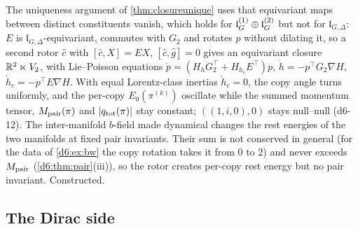 \begin{remark}
\label{d6:rem:copyrotor}
The uniqueness argument of \cref{thm:closureunique} uses that equivariant maps between distinct constituents vanish, which holds for
$\mathfrak l_G^{(1)}\oplus\mathfrak l_G^{(2)}$ but not for $\mathfrak l_{G,\Delta}$: $E$ is $\mathfrak l_{G,\Delta}$-equivariant, commutes with $G_2$ and rotates $p$ without dilating it, so a
second rotor $\hat c$ with $[\hat c,X]=EX$, $[\hat c,\hat g]=0$ gives an equivariant closure $\mathbb{R}^2\ltimes V_2$, with Lie--Poisson equations
$\dot p=(H_hG_2^{\!\top}+H_{h_c}E^{\!\top})p$, $\dot h=-p^{\!\top}G_2\nabla H$, $\dot h_c=-p^{\!\top}E\nabla H$. With equal Lorentz-class inertias
$\dot h_c=0$, the copy angle turns uniformly, and the per-copy $E_0(\pi^{(k)})$ oscillate while the summed momentum tensor, $M_{\rm pair}(\pi)$ and
$|q_{\rm tot}(\pi)|$ stay constant; $((1,i,0),0)$ stays null--null (d6-12). The inter-manifold $b$-field made dynamical changes
the rest energies of the two manifolds at fixed pair invariants. Their sum is not conserved in general (for the data of \cref{d6:ex:bw} the copy
rotation takes it from $0$ to $2$) and never exceeds $M_{\rm pair}$ (\cref{d6:thm:pair}(iii)), so the rotor creates per-copy rest energy but no
pair invariant. Constructed.
\end{remark}

\subsection{The Dirac side}
\label{d6:sec:dirac}

